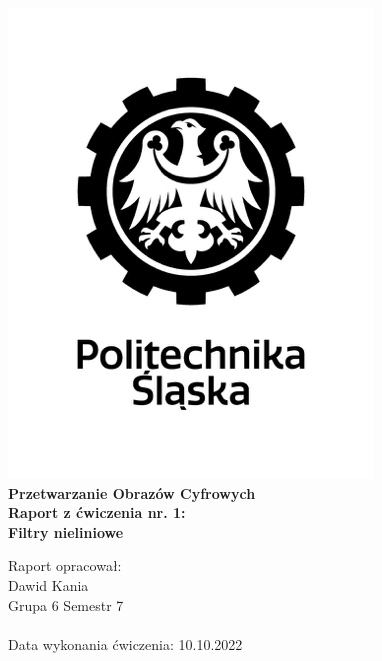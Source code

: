 
\begin{titlepage}
    \begin{center}
        \includegraphics[width=.50\linewidth]{other/polsl.png}\\
        \Huge
        \textbf{Przetwarzanie Obrazów Cyfrowych}
        \\ \vspace{1.5cm}
        \Large
        \textbf{Raport z ćwiczenia nr. 1: } \\
        \textbf{Filtry nieliniowe}        
    \end{center}
    \vspace{3.0cm}
    \Large
    Raport opracował: \\
    Dawid Kania \\
    Grupa 6 Semestr 7 \\ \\
    Data wykonania ćwiczenia: 10.10.2022
\end{titlepage}
